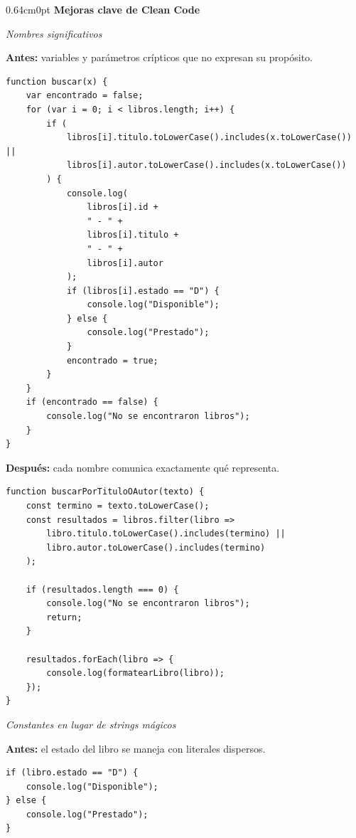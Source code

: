 \documentclass[12pt,letterpaper]{article}
\begin{document}
\begin{adjustwidth}{0.64cm}{0pt}
\vspace{8pt}
\textbf{Mejoras clave de Clean Code}
\vspace{4pt}

\vspace{6pt}
\textit{Nombres significativos}
\vspace{2pt}

\textbf{Antes:} variables y parámetros crípticos que no expresan su propósito.

\begin{lstlisting}[caption={Antes: nombres poco descriptivos}]
function buscar(x) {
    var encontrado = false;
    for (var i = 0; i < libros.length; i++) {
        if (
            libros[i].titulo.toLowerCase().includes(x.toLowerCase()) ||
            libros[i].autor.toLowerCase().includes(x.toLowerCase())
        ) {
            console.log(
                libros[i].id +
                " - " +
                libros[i].titulo +
                " - " +
                libros[i].autor
            );
            if (libros[i].estado == "D") {
                console.log("Disponible");
            } else {
                console.log("Prestado");
            }
            encontrado = true;
        }
    }
    if (encontrado == false) {
        console.log("No se encontraron libros");
    }
}
\end{lstlisting}

\textbf{Después:} cada nombre comunica exactamente qué representa.

\begin{lstlisting}[caption={Después: nombres autodescriptivos}]
function buscarPorTituloOAutor(texto) {
    const termino = texto.toLowerCase();
    const resultados = libros.filter(libro =>
        libro.titulo.toLowerCase().includes(termino) ||
        libro.autor.toLowerCase().includes(termino)
    );

    if (resultados.length === 0) {
        console.log("No se encontraron libros");
        return;
    }

    resultados.forEach(libro => {
        console.log(formatearLibro(libro));
    });
}
\end{lstlisting}

\vspace{6pt}
\textit{Constantes en lugar de strings mágicos}
\vspace{2pt}

\textbf{Antes:} el estado del libro se maneja con literales dispersos.

\begin{lstlisting}[caption={Antes: strings mágicos}]
if (libro.estado == "D") {
    console.log("Disponible");
} else {
    console.log("Prestado");
}


\end{lstlisting}
\end{adjustwidth}
\end{document}
